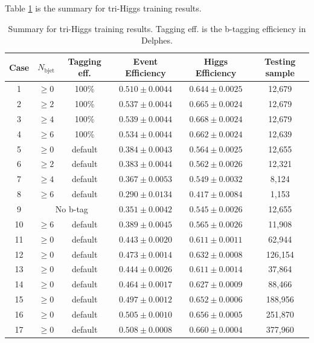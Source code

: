 \documentclass[12pt]{article}
\begin{document}
		Table \ref{tab:comparision_triHiggs_results} is the summary for tri-Higgs training results.
		\begin{table}[htpb]
			\centering
			\caption{Summary for tri-Higgs training results. Tagging eff. is the b-tagging efficiency in Delphes.}
			\label{tab:comparision_triHiggs_results}
			\begin{tabular}{c|cc|cc|c}
				Case & $N_{\text{bjet}}$& Tagging eff. & Event Efficiency & Higgs Efficiency & Testing sample \\
				\hline
				1&$\ge 0$ & 100\%	     &  $0.510 \pm 0.0044$   &  $0.644 \pm 0.0025$  &  12,679	\\
				2&$\ge 2$ & 100\%	     &  $0.537 \pm 0.0044$   &  $0.665 \pm 0.0024$  &  12,679	\\
				3&$\ge 4$ & 100\%	     &  $0.539 \pm 0.0044$   &  $0.668 \pm 0.0024$  &  12,679	\\
				4&$\ge 6$ & 100\%	     &  $0.534 \pm 0.0044$   &  $0.662 \pm 0.0024$  &  12,639	\\
				5&$\ge 0$ & default	     &  $0.384 \pm 0.0043$   &  $0.564 \pm 0.0025$  &  12,655	\\
				6&$\ge 2$ & default	     &  $0.383 \pm 0.0044$   &  $0.562 \pm 0.0026$  &  12,321	\\
				7&$\ge 4$ & default	     &  $0.367 \pm 0.0053$   &  $0.549 \pm 0.0032$  &  8,124	\\
				8&$\ge 6$ & default	     &  $0.290 \pm 0.0134$   &  $0.417 \pm 0.0084$  &  1,153	\\
				9& \multicolumn{2}{|c|}{No b-tag}			     &  $0.351 \pm 0.0042$   &  $0.545 \pm 0.0026$  &  12,655	\\
				10&$\ge 6$ & default	 &  $0.389 \pm 0.0045$   &  $0.565 \pm 0.0026$  &  11,908	\\
				11&$\ge 0$ & default	 &  $0.443 \pm 0.0020$   &  $0.611 \pm 0.0011$  &  62,944	\\
				12&$\ge 0$ & default	 &  $0.473 \pm 0.0014$   &  $0.632 \pm 0.0008$  &  126,154	\\
				13&$\ge 0$ & default	 &  $0.444 \pm 0.0026$   &  $0.611 \pm 0.0014$  &  37,864	\\
				14&$\ge 0$ & default	 &  $0.464 \pm 0.0017$   &  $0.627 \pm 0.0009$  &  88,466	\\
				15&$\ge 0$ & default	 &  $0.497 \pm 0.0012$   &  $0.652 \pm 0.0006$  &  188,956	\\
				16&$\ge 0$ & default	 &  $0.505 \pm 0.0010$   &  $0.656 \pm 0.0005$  &  251,870	\\
				17&$\ge 0$ & default	 &  $0.508 \pm 0.0008$   &  $0.660 \pm 0.0004$  &  377,960	\\
			\end{tabular}
		\end{table}
\end{document}
